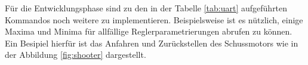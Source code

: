 Für die Entwicklungsphase sind zu den in der Tabelle \ref{tab:uart}
aufgeführten Kommandos noch weitere zu implementieren. Beispielsweise
ist es nützlich, einige Maxima und Minima für allfällige
Reglerparametrierungen abrufen zu können. Ein Besipiel hierfür ist das
Anfahren und Zurückstellen des Schussmotors wie in der Abbildung
\ref{fig:shooter} dargestellt.

\begin{comment}
\begin{figure}[h!]
	\centering
	\begin{tikzpicture}
		\draw[->] (-0.2,0) -- (10,0) node[anchor=north] {$t$};
		\draw[->] (0,-0.2) -- (0,4) node[anchor=east] {$RPM$};
		\draw[dotted] (3,3.5) -- (3,1.5);
		\draw[dotted] (7,3.5) -- (7,1.5);
		\draw[red, thick] 
			(0,0) sin (2,3.5) cos (2.5,3.25) sin (3,3);
		\draw[red, dotted]
			(0,0) sin (2,3.25) cos (2.5,3.125) sin (3,3);
		\draw[red, dotted]
			(0,0) sin (3,3);
		\draw[red, thick] 
			(3,3) -- (4,3) -- 
			(4,1) sin (6,3.5) cos (6.5,3.25) sin (7,3);
		\draw[red, dotted]
			(4,1) sin (6,3.25) cos (6.5,3.125) sin (7,3);
		\draw[red, dotted]
			(4,1) sin (7,3);
		\draw[red, thick] (7,3) -- (9,3);
		\draw[] (2,3.5) node[anchor=south] {$\omega_{max}$};
		\draw[] (4,1) node[anchor=north] {$\omega_{min}$};
		\draw[] (8,3) node[anchor=south] {$\omega_{mean}$};
		\draw[<->] (0,2) -- (3,2) node[midway, above] {$t_{ready}$};
		\draw[<->] (4,2) -- (7,2) node[midway, above] {$t_{reset}$};
	\end{tikzpicture}
	\caption{Vereinfachter Verlauf der Schussmotorendrehzahl für Anfahrt
		und einfache Schussabgabe}
	\label{fig:shooter}
\end{figure}
\end{comment}

